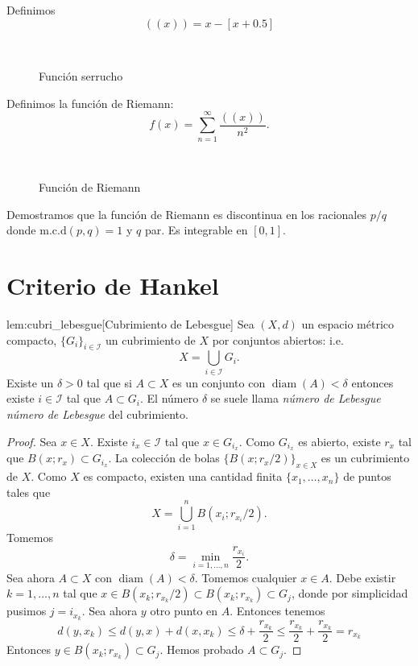 \begin{ejemplo}{} Definimos
\[
 ((x))=x-[x+0.5]
\]

\begin{figure}[H]
\begin{center}
\\
 \caption{Función serrucho}
\end{center}
 \end{figure}


Definimos la función de Riemann:
\[
 f(x)=\sum_{n=1}^{\infty}\frac{((x))}{n^2}.
\]

\begin{figure}[H]
\begin{center}
\\
\caption{Función de Riemann}
 \end{center}
 \end{figure}
 
Demostramos que la función de Riemann es discontinua en los racionales $p/q$ donde $\text{m.c.d}(p,q)=1$ y $q$ par. Es integrable en $[0,1]$.  
 
\end{ejemplo}


\section{Criterio de Hankel}

\begin{lema}{lem:cubri_lebesgue}[Cubrimiento de Lebesgue] Sea $(X,d)$ un espacio métrico compacto, $\{G_i\}_{i\in\mathscr{I}}$ un cubrimiento de $X$ por conjuntos abiertos: i.e.
\[
 X=\bigcup_{i\in\mathscr{I}}G_i.
\]
Existe un $\delta>0$ tal que si $A\subset X$ es un conjunto con $\operatorname{diam}(A)<\delta$ entonces existe $i\in\mathscr{I}$ tal que $A\subset G_i$. El número $\delta$ se suele llama  \emph{número de Lebesgue} \emph{número de Lebesgue} del cubrimiento.
 
\end{lema}
\begin{proof} Sea $x\in X$. Existe $i_x\in\mathscr{I}$ tal que $x\in G_{i_x}$. Como $G_{i_x}$ es abierto, existe $r_x$ tal que $B(x;r_x)\subset G_{i_x}$. La colección de bolas $\{B(x;r_x/2)\}_{x\in X}$ es un cubrimiento de $X$. Como $X$ es compacto, existen una cantidad finita $\{x_1,\ldots,x_n\}$ de puntos tales que
\[
 X=\bigcup_{i=1}^n B(x_i;r_{x_i}/2).
\]
Tomemos 
\[
 \delta=\min_{i=1,\ldots,n}\frac{r_{x_i}}{2}.
\]
Sea ahora $A\subset X$ con $\operatorname{diam}(A)<\delta$. Tomemos cualquier $x\in A$. Debe existir $k=1,\ldots,n$ tal que $x\in B(x_k;r_{x_k}/2)\subset B(x_k;r_{x_k})\subset G_j$, donde por simplicidad pusimos $j=i_{x_k}$. Sea ahora $y$ otro punto en $A$. Entonces tenemos
\[
 d(y,x_k)\leq d(y,x)+d(x,x_k)\leq\delta + \frac{r_{x_k}}{2}\leq\frac{r_{x_k}}{2}+ \frac{r_{x_k}}{2}=r_{x_k}
\]
Entonces $y\in B(x_k;r_{x_k})\subset  G_j$. Hemos probado $A\subset G_j$. 
\end{proof}




